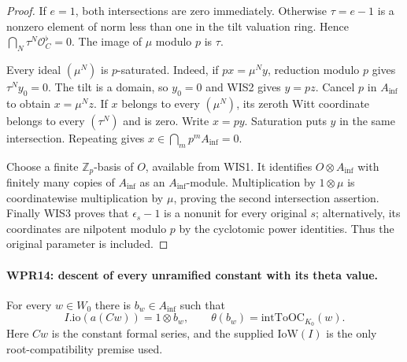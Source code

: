 \begin{proof}
If $e=1$, both intersections are zero immediately. Otherwise
$\tau=e-1$ is a nonzero element of norm less than one in the
tilt valuation ring. Hence $\bigcap_N\tau^N\mathcal O_C^\flat=0$.
The image of $\mu$ modulo $p$ is $\tau$.

Every ideal $(\mu^N)$ is $p$-saturated. Indeed, if
$p x=\mu^N y$, reduction modulo $p$ gives $\tau^Ny_0=0$.
The tilt is a domain, so $y_0=0$ and WIS2 gives $y=pz$.
Cancel $p$ in $A_{\mathrm{inf}}$ to obtain $x=\mu^Nz$.
If $x$ belongs to every $(\mu^N)$, its zeroth Witt coordinate
belongs to every $(\tau^N)$ and is zero. Write $x=py$.
Saturation puts $y$ in the same intersection. Repeating gives
$x\in\bigcap_m p^mA_{\mathrm{inf}}=0$.

Choose a finite $\mathbb Z_p$-basis of $O$, available from WIS1.
It identifies $O\otimes A_{\mathrm{inf}}$ with finitely many copies of
$A_{\mathrm{inf}}$ as an $A_{\mathrm{inf}}$-module. Multiplication by $1\otimes\mu$
is coordinatewise multiplication by $\mu$, proving the second
intersection assertion. Finally WIS3 proves that
$\epsilon_s-1$ is a nonunit for every original $s$; alternatively,
its coordinates are nilpotent modulo $p$ by the cyclotomic
power identities. Thus the original parameter is included.
\end{proof}

\paragraph{WPR14: descent of every unramified constant with its theta value.}
\label{claim:WPR14}
For every $w\in W_0$ there is $b_w\in A_{\mathrm{inf}}$ such that
\[
 I.\mathrm{io}(a(Cw))=1\otimes b_w,
             \qquad \theta(b_w)=\mathrm{intToOC}_{K_0}(w).
 \tag{WPR.16}
\]
Here $Cw$ is the constant formal series, and the supplied
$\mathrm{IoW}(I)$ is the only root-compatibility premise used.


